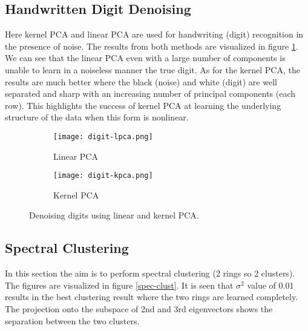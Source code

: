 \documentclass[paper=a4, fontsize=11pt]{scrartcl} %
\numberwithin{equation}{section} %
\begin{document}
\subsection{Handwritten Digit Denoising}

Here kernel PCA and linear PCA are used for handwriting (digit) recognition in the presence of noise. The results from both methods are visualized in figure \ref{digits}. We can see that the linear PCA even with a large number of components is unable to learn in a noiseless manner the true digit. As for the kernel PCA, the results are much better where the black (noise) and white (digit) are well separated and sharp with an increasing number of principal components (each row). This highlights the success of kernel PCA at learning the underlying structure of the data when this form is nonlinear.

\begin{figure}[ht]
\centering
	\begin{subfigure}[b]{0.5\textwidth}
		\centering
		\texttt{[image: digit-lpca.png]}
		\caption{Linear PCA}
	\end{subfigure}%
	\begin{subfigure}[b]{0.5\textwidth}
		\centering
		\texttt{[image: digit-kpca.png]}
		\caption{Kernel PCA}
	\end{subfigure}
\caption{Denoising digits using linear and kernel PCA.}
\label{digits}
\end{figure}

\subsection{Spectral Clustering}

In this section the aim is to perform spectral clustering (2 rings so 2 clusters). The figures are visualized in figure \ref{spec-clust}. It is seen that $\sigma^2$ value of 0.01 results in the best clustering result where the two rings are learned completely. The projection onto the subspace of 2nd and 3rd eigenvectors shows the separation between the two clusters.
\end{document}
